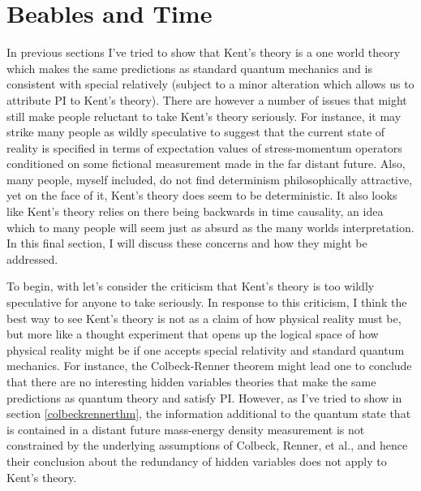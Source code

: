 \section{Beables and Time}
In previous sections I've tried to show that Kent's theory is a one world theory which makes the same predictions as standard quantum mechanics and is consistent with special relatively (subject to a minor alteration which allows us to attribute PI to Kent's theory). There are however a number of issues that might still make people reluctant to take Kent's theory seriously. For instance, it may strike many people as wildly speculative to suggest that the current state of reality is specified in terms of expectation values of stress-momentum operators conditioned on some fictional measurement made in the far distant future. Also, many people, myself included, do not find determinism philosophically attractive, yet on the face of it, Kent's theory does seem to be deterministic. It also looks like Kent's theory relies on there being backwards in time causality, an idea which to many people will seem just as absurd as the many worlds interpretation. In this final section, I will discuss these concerns and how they might be addressed.

To begin, with let's consider the criticism that Kent's theory is too wildly speculative for anyone to take seriously. In response to this criticism, I think the best way to see Kent's theory is not as a claim of how physical reality must be, but more like a thought experiment that opens up the logical space of how physical reality might be if one accepts special relativity and standard quantum mechanics. For instance, the Colbeck-Renner theorem might lead one to conclude that there are no interesting hidden variables theories that make the same predictions as quantum theory and satisfy PI. However, as I've tried to show in section \ref{colbeckrennerthm}, the information additional to the quantum state that is contained in a distant future mass-energy density measurement is not constrained by the underlying assumptions of Colbeck, Renner, et al., and hence their conclusion about the redundancy of hidden variables does not apply to Kent's theory. 

